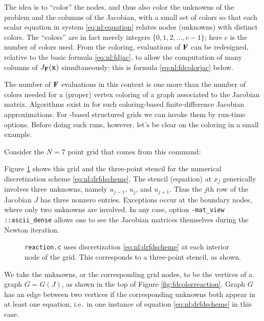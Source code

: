 The idea is to ``color'' the nodes, and thus also color the unknowns of the problem and the columns of the Jacobian, with a small set of colors so that each scalar equation in system \eqref{eq:nl:equation} relates nodes (unknowns) with distinct colors.  The ``colors'' are in fact merely integers $\{0,1,2,\dots,c-1\}$; here $c$ is the number of colors used.  From the coloring, evaluations of $\mathbf{F}$ can be redesigned, relative to the basic formula \eqref{eq:nl:fdjac}, to allow the computation of many columns of $J_{\mathbf{F}}(\mathbf{x})$ simultaneously; this is formula \eqref{eq:nl:fdcolorjac} below.

The number of $\mathbf{F}$ evaluations in this context is one more than the number of colors needed for a (proper) vertex coloring \citep[e.g.~as defined in][]{ChartrandLesniakZhang2011} of a graph associated to the Jacobian matrix.  Algorithms exist in \PETSc for such coloring-based finite-difference Jacobian approximations.  For \pDMDA-based structured grids we can invoke them by run-time options.  Before doing such runs, however, let's be clear on the coloring in a small example.

Consider the $N=7$ point grid that comes from this command:
Figure \ref{fig:stencilreaction} shows this grid and the three-point stencil for the numerical discretization scheme \eqref{eq:nl:drfdscheme}.  The stencil (equation) at $x_j$ generically involves three unknowns, namely $u_{j-1}$, $u_j$, and $u_{j+1}$.  Thus the $j$th row of the Jacobian $J$ has three nonzero entries.  Exceptions occur at the boundary nodes, where only two unknowns are involved.  In any case, option \texttt{-mat\_view ::ascii\_dense} allows one to see the Jacobian matrices themselves during the Newton iteration.

\begin{figure}

\caption{\texttt{reaction.c} uses discretization \eqref{eq:nl:drfdscheme} at each interior node of the grid.  This corresponds to a three-point stencil, as shown.}
\label{fig:stencilreaction}
\end{figure}

We take the unknowns, or the corresponding grid nodes, to be the vertices of a graph $G=G(J)$, as shown in the top of Figure \ref{fig:fdcolorreaction}.  Graph $G$ has an edge between two vertices if the corresponding unknowns both appear in at least one equation, i.e.~in one instance of equation \eqref{eq:nl:drfdscheme} in this case.

